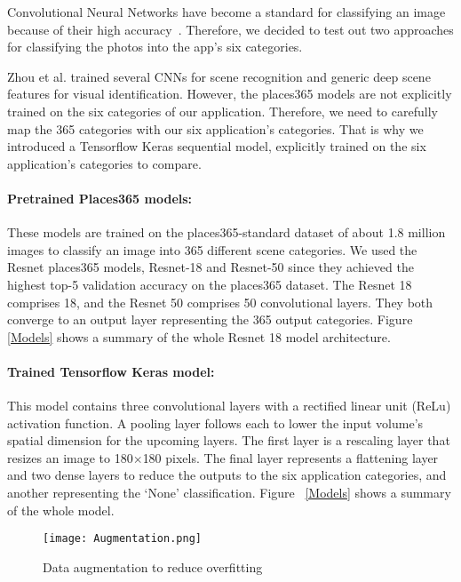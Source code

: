 Convolutional Neural Networks have become a standard
for classifying an image because of their high
accuracy~\cite{Zhou2018}. Therefore, we decided to test
out two approaches for classifying the photos into the
app's six categories. 

Zhou et al. \cite{Zhou2018} trained several CNNs for
scene recognition and generic deep scene features for
visual identification. However, the places365 models
are not explicitly trained on the six categories of
our application. Therefore, we need to carefully map
the 365 categories with our six application's
categories. That is why we introduced a Tensorflow
Keras sequential model, explicitly trained on the six
application's categories to compare.

\paragraph{Pretrained Places365 models:} These models
are trained on the places365-standard dataset of about
1.8 million images to classify an image into 365
different scene categories. We used the Resnet
places365 models, Resnet-18 and Resnet-50 since they
achieved the highest top-5 validation accuracy on the
places365 dataset. The Resnet 18 comprises 18, and the
Resnet 50 comprises 50 convolutional layers. They both
converge to an output layer representing the 365
output categories.  Figure \ref{Models} shows a
summary of the whole Resnet 18 model architecture.

\paragraph{Trained Tensorflow Keras model: } This
model contains three convolutional layers with a
rectified linear unit (ReLu) activation function. A
pooling layer follows each to lower the input volume's
spatial dimension for the upcoming layers. The first
layer is a rescaling layer that resizes an image to
180$\times$180 pixels. The final layer represents a
flattening layer and two dense layers to reduce the
outputs to the six application categories, and another
representing the `None' classification. Figure
~\ref{Models} shows a summary of the whole model.

\begin{figure}[h]
\centering
\texttt{[image: Augmentation.png]}
\caption{Data augmentation to reduce overfitting}
\label{Augmentation}
\end{figure}

